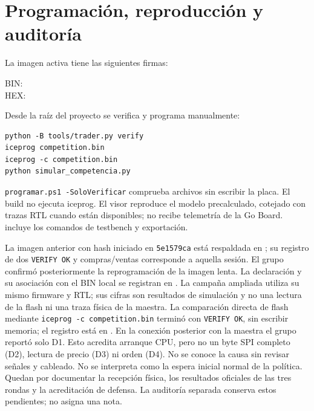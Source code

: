 \documentclass[11pt,a4paper]{article}
\begin{document}


\section{Programación, reproducción y auditoría}
La imagen activa tiene las siguientes firmas:
\begin{flushleft}\small BIN: \texttt{\BinSHA}\\
HEX: \texttt{\HexSHA}\end{flushleft}
Desde la raíz del proyecto se verifica y programa manualmente:
\begin{lstlisting}
python -B tools/trader.py verify
iceprog competition.bin
iceprog -c competition.bin
python simular_competencia.py
\end{lstlisting}
\texttt{programar.ps1 -SoloVerificar} comprueba archivos sin escribir la placa.
El build no ejecuta iceprog. El visor reproduce el modelo precalculado, cotejado
con trazas RTL cuando están disponibles; no recibe telemetría de la Go Board.
 incluye los comandos de testbench y exportación.

La imagen anterior con hash iniciado en \texttt{5e1579ca} está respaldada en
; su registro de dos
\texttt{VERIFY OK} y compras/ventas corresponde a aquella sesión.
El grupo confirmó posteriormente la reprogramación de la imagen lenta.
La declaración y su asociación con el BIN local se registran en
.
La campaña ampliada utiliza su mismo firmware y RTL; sus cifras son resultados
de simulación y no una lectura de la flash ni una traza física de la maestra.
La comparación directa de flash mediante \texttt{iceprog -c competition.bin}
terminó con \texttt{VERIFY OK}, sin escribir memoria; el registro está en
.
En la conexión posterior con la maestra el grupo reportó solo D1. Esto acredita
arranque CPU, pero no un byte SPI completo (D2), lectura de precio (D3) ni orden
(D4). No se conoce la causa sin revisar señales y cableado. No se interpreta
como la espera inicial normal de la política. Quedan por documentar la recepción
física, los resultados oficiales de las tres rondas y la acreditación de defensa.
La auditoría separada conserva estos pendientes; no asigna una nota.
\end{document}
